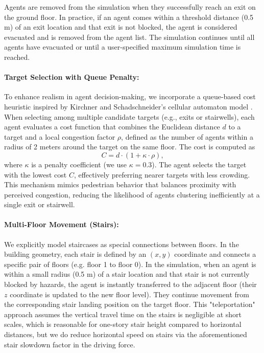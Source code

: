 \documentclass[11pt,a4paper]{article}
\begin{document}
Agents are removed from the simulation when they successfully reach an exit on the ground floor. In practice, if an agent comes within a threshold distance (0.5 m) of an exit location and that exit is not blocked, the agent is considered evacuated and is removed from the agent list. The simulation continues until all agents have evacuated or until a user-specified maximum simulation time is reached.

\paragraph{Target Selection with Queue Penalty:}
To enhance realism in agent decision-making, we incorporate a queue-based cost heuristic inspired by Kirchner and Schadschneider's cellular automaton model \cite{Kirchner2002}. When selecting among multiple candidate targets (e.g., exits or stairwells), each agent evaluates a cost function that combines the Euclidean distance $d$ to a target and a local congestion factor $\rho$, defined as the number of agents within a radius of 2 meters around the target on the same floor. The cost is computed as
\begin{equation}
       C = d \cdot \left(1 + \kappa \cdot \rho \right),
\end{equation}
where $\kappa$ is a penalty coefficient (we use $\kappa = 0.3$). The agent selects the target with the lowest cost $C$, effectively preferring nearer targets with less crowding. This mechanism mimics pedestrian behavior that balances proximity with perceived congestion, reducing the likelihood of agents clustering inefficiently at a single exit or stairwell.


\paragraph{Multi-Floor Movement (Stairs):} We explicitly model staircases as special connections between floors. In the building geometry, each stair is defined by an $(x,y)$ coordinate and connects a specific pair of floors (e.g. floor 1 to floor 0). In the simulation, when an agent is within a small radius (0.5 m) of a stair location and that stair is not currently blocked by hazards, the agent is instantly transferred to the adjacent floor (their $z$ coordinate is updated to the new floor level). They continue movement from the corresponding stair landing position on the target floor. This "teleportation" approach assumes the vertical travel time on the stairs is negligible at short scales, which is reasonable for one-story stair height compared to horizontal distances, but we do reduce horizontal speed on stairs via the aforementioned stair slowdown factor in the driving force.
\end{document}
